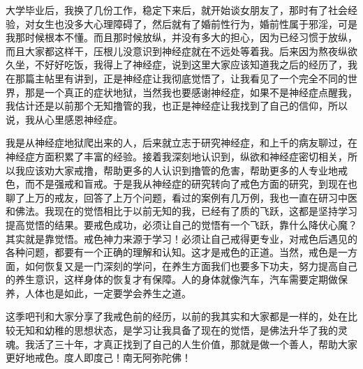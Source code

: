 大学毕业后，我换了几份工作，稳定下来后，就开始谈女朋友了，那时有了社会经验，对女生也没多大心理障碍了，然后就有了婚前性行为，婚前性属于邪淫，可是我那时候根本不懂。而且那时候放纵，并没有多大的担心，因为已经习惯于放纵，而且大家都这样干，压根儿没意识到神经症就在不远处等着我。后来因为熬夜纵欲久坐，不好好吃饭，我得上了神经症，说到这里大家应该知道我之后的经历了，我在那篇主帖里有讲到，正是神经症让我彻底觉悟了，让我看见了一个完全不同的世界，那是一个真正的症状地狱，当然我也要感谢神经症，如果不是神经症点醒我，我估计还是以前那个无知撸管的我，也正是神经症让我找到了自己的信仰，所以说，我从心里感恩神经症。

我是从神经症地狱爬出来的人，后来就立志于研究神经症，和上千的病友聊过，在神经症方面积累了丰富的经验。接着我深刻地认识到，纵欲和神经症密切相关，所以我应该劝大家戒撸，帮助更多的人认识到撸管的危害，帮助更多的人专业地戒色，而不是强戒和盲戒。于是我从神经症的研究转向了戒色方面的研究，到现在也聊了上万的戒友，回答了上万个问题，看过的案例有几万例，我也一直在研习中医和佛法。我现在的觉悟相比于以前无知的我，已经有了质的飞跃，这都是坚持学习提高觉悟的结果。要戒色成功，必须让自己的觉悟有一个飞跃，靠什么降伏心魔？其实就是靠觉悟。戒色神力来源于学习！必须让自己戒得更专业，对戒色后遇见的各种问题，都要有一个正确的理解和认知。这才是戒色的正道。当然，戒色是一方面，如何恢复又是一门深刻的学问，在养生方面我们也要多下功夫，努力提高自己的养生意识，这样身体的恢复才有保障。人的身体就像汽车，汽车需要定期做保养，人体也是如此，一定要学会养生之道。

这季吧刊和大家分享了我戒色前的经历，以前的我其实和大家都是一样的，处在比较无知和幼稚的思想状态，是学习让我具备了现在的觉悟，是佛法升华了我的灵魂。我活了三十年，才真正找到了自己的人生价值，那就是做一个善人，帮助大家更好地戒色。度人即度己！南无阿弥陀佛！
